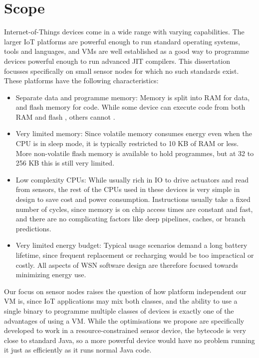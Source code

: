 \section{Scope}
\label{sec-introduction-scope}
Internet-of-Things devices come in a wide range with varying capabilities. The larger IoT platforms are powerful enough to run standard operating systems, tools and languages, and VMs are well established as a good way to programme devices powerful enough to run advanced JIT compilers. This dissertation focusses specifically on small sensor nodes for which no such standards exist. These platforms have the following characteristics:
\begin{itemize}
    \item Separate data and programme memory: Memory is split into RAM for data, and flash memory for code. While some device can execute code from both RAM and flash \cite{TexasInstrumentsIncorporated:MSP430F1611Datasheet}, others cannot \cite{Atmel:ATmega128Datasheet}.
    \item Very limited memory: Since volatile memory consumes energy even when the CPU is in sleep mode, it is typically restricted to 10 KB of RAM or less. More non-volatile flash memory is available to hold programmes, but at 32 to 256 KB this is still very limited.
    \item Low complexity CPUs: While usually rich in IO to drive actuators and read from sensors, the rest of the CPUs used in these devices is very simple in design to save cost and power consumption. Instructions usually take a fixed number of cycles, since memory is on chip access times are constant and fast, and there are no complicating factors like deep pipelines, caches, or branch predictions.
    \item Very limited energy budget: Typical usage scenarios demand a long battery lifetime, since frequent replacement or recharging would be too impractical or costly. All aspects of WSN software design are therefore focused towards minimizing energy use.
\end{itemize}

Our focus on sensor nodes raises the question of how platform independent our VM is, since IoT applications may mix both classes, and the ability to use a single binary to programme multiple classes of devices is exactly one of the advantages of using a VM. While the optimisations we propose are specifically developed to work in a resource-constrained sensor device, the bytecode is very close to standard Java, so a more powerful device would have no problem running it just as efficiently as it runs normal Java code.

